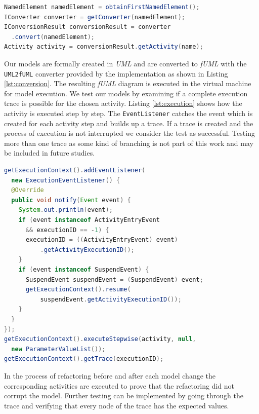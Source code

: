 \documentclass{llncs}
\begin{document}
\begin{lstlisting}[language=Java,caption=Converting the UML diagram to fUML,label=lst:conversion]
NamedElement namedElement = obtainFirstNamedElement();
IConverter converter = getConverter(namedElement);
IConversionResult conversionResult = converter
  .convert(namedElement);
Activity activity = conversionResult.getActivity(name);
\end{lstlisting}

Our models are formally created in \textit{UML} and are converted to \textit{fUML} with the \texttt{UML2fUML} converter 
provided by the implementation as shown in Listing \ref{lst:conversion}. The resulting \textit{fUML} diagram is executed in the 
virtual machine for model execution. 
We test our models by examining if a complete execution trace is possible for the chosen activity. Listing \ref{lst:execution} 
shows how the activity is executed step by step. The \texttt{EventListener} catches the event which is created for each 
activity step and builds up a trace. If a trace is created and the process of execution is not interrupted we consider the 
test as successful. Testing more than one trace as some kind of branching is not part of this work and may be included in future studies.

\begin{lstlisting}[language=Java,caption=Executing the activity stepwise and getting the execution trace,label=lst:execution]
getExecutionContext().addEventListener(
  new ExecutionEventListener() {
  @Override
  public void notify(Event event) {
    System.out.println(event);
    if (event instanceof ActivityEntryEvent 
      && executionID == -1) {
      executionID = ((ActivityEntryEvent) event)
          .getActivityExecutionID();
    }
    if (event instanceof SuspendEvent) {
      SuspendEvent suspendEvent = (SuspendEvent) event;
      getExecutionContext().resume(
          suspendEvent.getActivityExecutionID());
    }
  }
});
getExecutionContext().executeStepwise(activity, null, 
  new ParameterValueList());
getExecutionContext().getTrace(executionID);
\end{lstlisting}

In the process of refactoring before and after each model change the corresponding activities are executed to prove that 
the refactoring did not corrupt the model. 
Further testing can be implemented by going through the trace and verifying 
that every node of the trace has the expected values.
\end{document}
